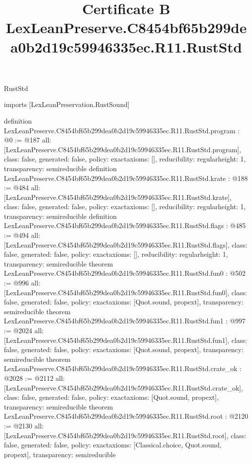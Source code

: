 \begin{lexlean}{RustStd}
\title{Certificate B LexLeanPreserve.C8454bf65b299dea0b2d19c59946335ec.R11.RustStd}
\begin{coremodule}
imports [LexLeanPreservation.RustSound]

definition LexLeanPreserve.C8454bf65b299dea0b2d19c59946335ec.R11.RustStd.program : @0 := @187 {
  all: [LexLeanPreserve.C8454bf65b299dea0b2d19c59946335ec.R11.RustStd.program],
  class: false,
  generated: false,
  policy: exact{axioms: []},
  reducibility: regular{height: 1},
  transparency: semireducible
}
definition LexLeanPreserve.C8454bf65b299dea0b2d19c59946335ec.R11.RustStd.krate : @188 := @484 {
  all: [LexLeanPreserve.C8454bf65b299dea0b2d19c59946335ec.R11.RustStd.krate],
  class: false,
  generated: false,
  policy: exact{axioms: []},
  reducibility: regular{height: 1},
  transparency: semireducible
}
definition LexLeanPreserve.C8454bf65b299dea0b2d19c59946335ec.R11.RustStd.flags : @485 := @494 {
  all: [LexLeanPreserve.C8454bf65b299dea0b2d19c59946335ec.R11.RustStd.flags],
  class: false,
  generated: false,
  policy: exact{axioms: []},
  reducibility: regular{height: 1},
  transparency: semireducible
}
theorem LexLeanPreserve.C8454bf65b299dea0b2d19c59946335ec.R11.RustStd.fun0 : @502 := @996 {
  all: [LexLeanPreserve.C8454bf65b299dea0b2d19c59946335ec.R11.RustStd.fun0],
  class: false,
  generated: false,
  policy: exact{axioms: [Quot.sound, propext]},
  transparency: semireducible
}
theorem LexLeanPreserve.C8454bf65b299dea0b2d19c59946335ec.R11.RustStd.fun1 : @997 := @2024 {
  all: [LexLeanPreserve.C8454bf65b299dea0b2d19c59946335ec.R11.RustStd.fun1],
  class: false,
  generated: false,
  policy: exact{axioms: [Quot.sound, propext]},
  transparency: semireducible
}
theorem LexLeanPreserve.C8454bf65b299dea0b2d19c59946335ec.R11.RustStd.crate_ok : @2028 := @2112 {
  all: [LexLeanPreserve.C8454bf65b299dea0b2d19c59946335ec.R11.RustStd.crate_ok],
  class: false,
  generated: false,
  policy: exact{axioms: [Quot.sound, propext]},
  transparency: semireducible
}
theorem LexLeanPreserve.C8454bf65b299dea0b2d19c59946335ec.R11.RustStd.root : @2120 := @2130 {
  all: [LexLeanPreserve.C8454bf65b299dea0b2d19c59946335ec.R11.RustStd.root],
  class: false,
  generated: false,
  policy: exact{axioms: [Classical.choice, Quot.sound, propext]},
  transparency: semireducible
}


\end{coremodule}
\end{lexlean}
